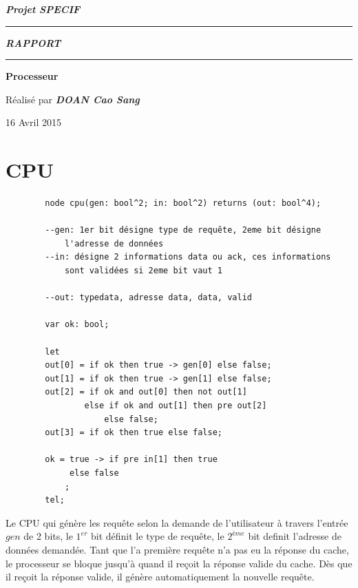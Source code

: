 \documentclass[a4paper,11pt]{report}
\begin{document}
	\begin{titlepage}
		\begin{center}
			\large\bfseries\itshape Projet SPECIF\\
		\end{center}
		\noindent\rule{\linewidth}{3pt}

		\begin{center}
			\Huge\bfseries\itshape RAPPORT\\
		\end{center}
		
		\noindent\rule{\linewidth}{3pt}
		\begin{center}
			\bfseries
			\large Processeur
			
		\end{center}
		\begin{center}
			Réalisé par \bfseries \itshape DOAN Cao Sang
		\end{center}
		\begin{center}
			16 Avril 2015
		\end{center}
	\end{titlepage}

\chapter{CPU}
	\begin{framed}
		\begin{verbatim}
		node cpu(gen: bool^2; in: bool^2) returns (out: bool^4);

		--gen: 1er bit désigne type de requête, 2eme bit désigne 
			l'adresse de données
		--in: désigne 2 informations data ou ack, ces informations 
			sont validées si 2eme bit vaut 1

		--out: typedata, adresse data, data, valid

		var ok: bool;

		let
		out[0] = if ok then true -> gen[0] else false;
		out[1] = if ok then true -> gen[1] else false;
		out[2] = if ok and out[0] then not out[1]
                else if ok and out[1] then pre out[2]
                    else false;
		out[3] = if ok then true else false;

		ok = true -> if pre in[1] then true
             else false
			;
		tel;
	\end{verbatim}
	\end{framed}
	
	Le CPU qui génère les requête selon la demande de l'utilisateur à travers l'entrée $gen$ de 2 bits, le $1^{er}$ bit définit le type de requête, le $2^{ème}$ bit definit l'adresse de données demandée. Tant que l'a première requête n'a pas eu la réponse du cache, le processeur se bloque jusqu'à quand il reçoit la réponse valide du cache. Dès que il reçoit la réponse valide, il génère automatiquement la nouvelle requête.
	
\end{document}
